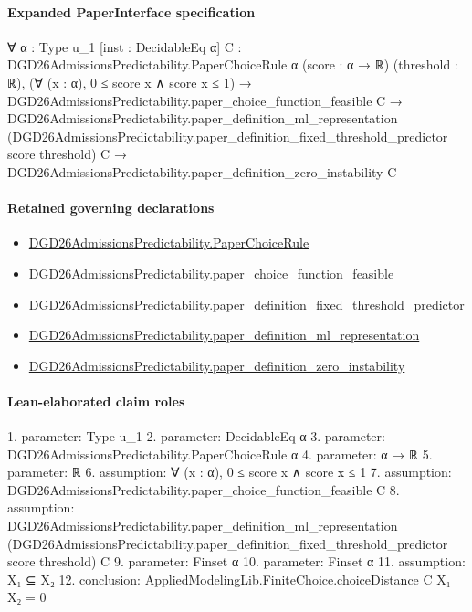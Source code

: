 \documentclass[10pt]{article}
\begin{document}
\paragraph{Expanded PaperInterface specification}
\begin{ReviewVerbatim}
∀ {α : Type u_1} [inst : DecidableEq α] {C : DGD26AdmissionsPredictability.PaperChoiceRule α} (score : α → ℝ)
  (threshold : ℝ),
  (∀ (x : α), 0 ≤ score x ∧ score x ≤ 1) →
    DGD26AdmissionsPredictability.paper_choice_function_feasible C →
      DGD26AdmissionsPredictability.paper_definition_ml_representation
          (DGD26AdmissionsPredictability.paper_definition_fixed_threshold_predictor score threshold) C →
        DGD26AdmissionsPredictability.paper_definition_zero_instability C
\end{ReviewVerbatim}

\paragraph{Retained governing declarations}
\begin{itemize}\raggedright
\item \hyperlink{governing-declaration-4678951b4432b184}{DGD26\allowbreak{}Admissions\allowbreak{}Predictability.\allowbreak{}Paper\allowbreak{}Choice\allowbreak{}Rule}
\item \hyperlink{governing-declaration-f7de74a44053f6d5}{DGD26\allowbreak{}Admissions\allowbreak{}Predictability.\allowbreak{}paper\_\allowbreak{}choice\_\allowbreak{}function\_\allowbreak{}feasible}
\item \hyperlink{governing-declaration-f88639e6ec4557a8}{DGD26\allowbreak{}Admissions\allowbreak{}Predictability.\allowbreak{}paper\_\allowbreak{}definition\_\allowbreak{}fixed\_\allowbreak{}threshold\_\allowbreak{}predictor}
\item \hyperlink{governing-declaration-6f1fddfd896a577f}{DGD26\allowbreak{}Admissions\allowbreak{}Predictability.\allowbreak{}paper\_\allowbreak{}definition\_\allowbreak{}ml\_\allowbreak{}representation}
\item \hyperlink{governing-declaration-c23ecf0aa84721c4}{DGD26\allowbreak{}Admissions\allowbreak{}Predictability.\allowbreak{}paper\_\allowbreak{}definition\_\allowbreak{}zero\_\allowbreak{}instability}
\end{itemize}
\paragraph{Lean-elaborated claim roles}\begin{ReviewVerbatim}
1. parameter: Type u_1
2. parameter: DecidableEq α
3. parameter: DGD26AdmissionsPredictability.PaperChoiceRule α
4. parameter: α → ℝ
5. parameter: ℝ
6. assumption: ∀ (x : α), 0 ≤ score x ∧ score x ≤ 1
7. assumption: DGD26AdmissionsPredictability.paper_choice_function_feasible C
8. assumption: DGD26AdmissionsPredictability.paper_definition_ml_representation
  (DGD26AdmissionsPredictability.paper_definition_fixed_threshold_predictor score threshold) C
9. parameter: Finset α
10. parameter: Finset α
11. assumption: X₁ ⊆ X₂
12. conclusion: AppliedModelingLib.FiniteChoice.choiceDistance C X₁ X₂ = 0
\end{ReviewVerbatim}
\end{document}
